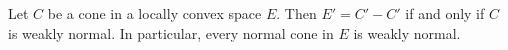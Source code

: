 Let $C$ be a cone in a locally convex space $E$. Then $E' = C' - C'$ if and only if $C$ is weakly normal. In particular, every normal cone in $E$ is weakly normal.
